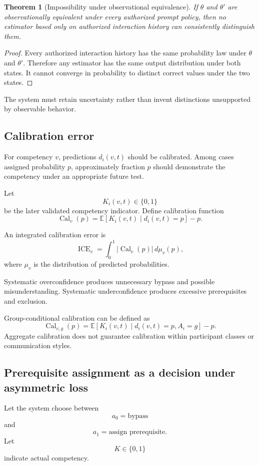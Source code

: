 \documentclass[11pt]{article}
\newtheorem{theorem}[definition]{Theorem}
\theoremstyle{definition}
\newcommand{\E}{\mathbb{E}}
\begin{document}
\begin{theorem}[Impossibility under observational equivalence]
If \(\theta\) and \(\theta'\) are observationally equivalent under every authorized prompt policy, then no estimator based only on authorized interaction history can consistently distinguish them.
\end{theorem}

\begin{proof}
Every authorized interaction history has the same probability law under \(\theta\) and \(\theta'\). Therefore any estimator has the same output distribution under both states. It cannot converge in probability to distinct correct values under the two states.
\end{proof}

The system must retain uncertainty rather than invent distinctions unsupported by observable behavior.

\subsection{Calibration error}

For competency \(v\), predictions \(d_i(v,t)\) should be calibrated. Among cases assigned probability \(p\), approximately fraction \(p\) should demonstrate the competency under an appropriate future test.

Let
\[
K_i(v,t)\in\{0,1\}
\]
be the later validated competency indicator. Define calibration function
\[
\operatorname{Cal}_v(p)
=
\E[K_i(v,t)\mid d_i(v,t)=p]-p.
\]

An integrated calibration error is
\[
\operatorname{ICE}_v
=
\int_0^1
|\operatorname{Cal}_v(p)|
\,d\mu_v(p),
\]
where \(\mu_v\) is the distribution of predicted probabilities.

Systematic overconfidence produces unnecessary bypass and possible misunderstanding. Systematic underconfidence produces excessive prerequisites and exclusion.

Group-conditional calibration can be defined as
\[
\operatorname{Cal}_{v,g}(p)
=
\E[K_i(v,t)\mid d_i(v,t)=p,A_i=g]-p.
\]
Aggregate calibration does not guarantee calibration within participant classes or communication styles.

\subsection{Prerequisite assignment as a decision under asymmetric loss}

Let the system choose between
\[
a_0=\text{bypass}
\]
and
\[
a_1=\text{assign prerequisite}.
\]
Let
\[
K\in\{0,1\}
\]
indicate actual competency.
\end{document}
